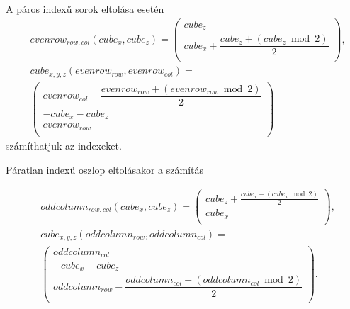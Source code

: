 %

A páros indexű sorok eltolása esetén
\begin{align*}
&evenrow_{row, col}(cube_{x}, cube_{z}) =
\left(
\begin{array}{c}
cube_{z} \\
cube_{x} + \dfrac{cube_{z} + (cube_{z} \bmod 2)}{2} \\
\end{array}
\right),
\\
&cube_{x, y, z}(evenrow_{row}, evenrow_{col}) = \\
&\left(
\begin{array}{c}
evenrow_{col} - \dfrac{evenrow_{row} + (evenrow_{row} \bmod 2)}{2} \\
-cube_{x} - cube_{z} \\
evenrow_{row} \\
\end{array}
\right)
\end{align*}
számíthatjuk az indexeket.

%

Páratlan indexű oszlop eltolásakor a számítás

\begin{align*}
&oddcolumn_{row, col}(cube_{x}, cube_{z}) =
\left(
\begin{array}{c}
cube_{z} + \frac{cube_{x} - (cube_{x} \bmod 2)}{2} \\
cube_{x} \\
\end{array}
\right),
\\
&cube_{x,y,z} (oddcolumn_{row}, oddcolumn_{col}) = \\
&\left(
\begin{array}{c}
oddcolumn_{col} \\
-cube_{x} - cube_{z} \\
oddcolumn_{row} - \dfrac{oddcolumn_{col} - (oddcolumn_{col} \bmod 2)}{2} \\
\end{array}
\right).
\end{align*}

